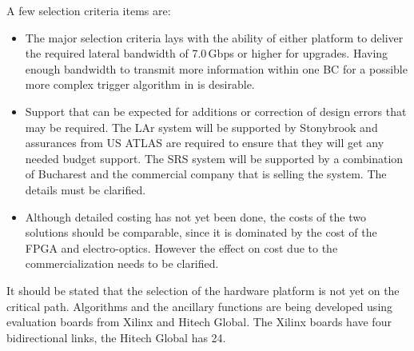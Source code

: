 A few selection criteria items are:
\begin{itemize}
\item The major selection criteria lays with the ability of either platform to
deliver the required lateral bandwidth of 7.0\,Gbps or higher for upgrades.
Having enough bandwidth to transmit more information within one BC for a possible more complex trigger algorithm in \PhaseTwo is desirable.

\item Support that can be expected for additions or correction of design errors that may be required. The LAr system will be supported by Stonybrook and assurances from US ATLAS are required to ensure that they will get any needed budget support. The SRS system will be supported by a combination of Bucharest and the commercial company that is selling the system. The details must be clarified.

\item Although detailed costing has not yet been done, the costs of the two solutions should be comparable, since it is dominated by the cost of the FPGA and electro-optics. However the effect on cost due to the commercialization needs to be clarified.
\end{itemize}


It should be stated that the selection of the hardware platform is not yet on the critical path.
Algorithms and the ancillary functions are being developed using evaluation boards from Xilinx and Hitech Global.
The Xilinx boards have four bidirectional links, the Hitech Global has 24.




